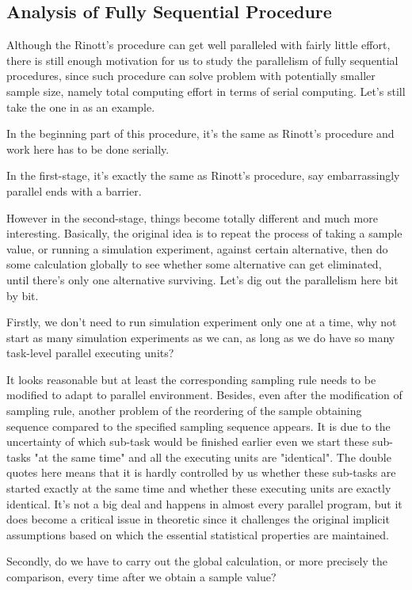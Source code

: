\subsection{Analysis of Fully Sequential Procedure}

Although the Rinott's procedure can get well paralleled with fairly little effort, there is still enough motivation for us to study the parallelism of fully sequential procedures, since such procedure can solve problem with potentially smaller sample size, namely total computing effort in terms of serial computing. Let's still take the one in \cite{ras-seq-jeff} as an example.

In the beginning part of this procedure, it's the same as Rinott's procedure and work here has to be done serially.

In the first-stage, it's exactly the same as Rinott's procedure, say embarrassingly parallel ends with a barrier.

However in the second-stage, things become totally different and much more interesting. Basically, the original idea is to repeat the process of taking a sample value, or running a simulation experiment, against certain alternative, then do some calculation globally to see whether some alternative can get eliminated, until there's only one alternative surviving. Let's dig out the parallelism here bit by bit.

Firstly, we don't need to run simulation experiment only one at a time, why not start as many simulation experiments as we can, as long as we do have so many task-level parallel executing units?

It looks reasonable but at least the corresponding sampling rule needs to be modified to adapt to parallel environment. Besides, even after the modification of sampling rule, another problem of the reordering of the sample obtaining sequence compared to the specified sampling sequence appears. It is due to the uncertainty of which sub-task would be finished earlier even we start these sub-tasks "at the same time" and all the executing units are "identical". The double quotes here means that it is hardly controlled by us whether these sub-tasks are started exactly at the same time and whether these executing units are exactly identical. It's not a big deal and happens in almost every parallel program, but it does become a critical issue in theoretic since it challenges the original implicit assumptions based on which the essential statistical properties are maintained.

Secondly, do we have to carry out the global calculation, or more precisely the comparison, every time after we obtain a sample value?

